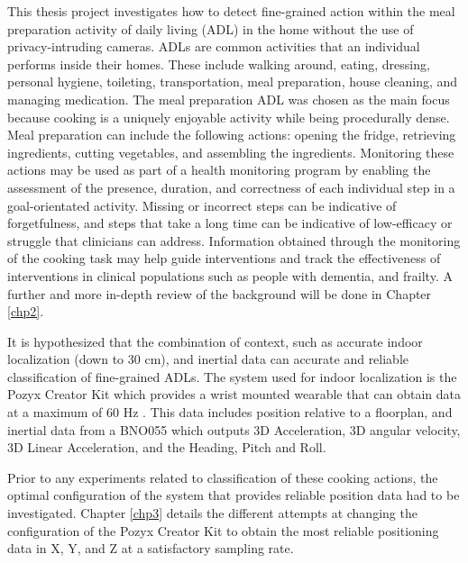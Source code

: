 This thesis project investigates how to detect fine-grained action within the meal preparation activity of daily living 
(ADL) in the home without the use of privacy-intruding cameras. ADLs are common activities that an individual 
performs inside their homes. These include walking around, eating, dressing, personal hygiene, toileting, 
transportation, meal preparation, house cleaning, and managing medication. The meal preparation ADL was chosen as the 
main focus because cooking is a uniquely enjoyable activity while being procedurally dense. 
Meal preparation can include 
the following actions: opening the fridge, retrieving ingredients, cutting vegetables, and assembling the ingredients. 
Monitoring these actions may be used as part of a health monitoring program by enabling the assessment of the presence, 
duration, and correctness of each individual step in a goal-orientated activity. Missing or incorrect steps can be indicative of 
forgetfulness, and steps that take a long time can be indicative of low-efficacy or struggle that clinicians can address.
Information obtained through the monitoring of the cooking task may help guide interventions 
and track the effectiveness of interventions in clinical populations such as people with dementia, and frailty. 
A further and more in-depth review of the background will be done in Chapter \ref{chp2}.

It is hypothesized that the combination of context, such as accurate 
indoor localization (down to 30 cm), and inertial data can accurate and reliable 
classification of fine-grained ADLs. 
The system used for indoor localization is the Pozyx Creator Kit which provides a wrist mounted 
wearable that can obtain data at a maximum of 60 Hz \cite{pozyx_creator_nodate}. This data includes position relative to a 
floorplan, and inertial data from a BNO055 which outputs 3D Acceleration, 3D angular velocity, 
3D Linear Acceleration, and the Heading, Pitch and Roll.

Prior to any experiments related to classification of these cooking actions, the optimal 
configuration of the system that provides reliable position data had to be investigated. 
Chapter \ref{chp3} details the different attempts at changing the configuration of the Pozyx 
Creator Kit to obtain the most reliable positioning data in X, Y, and Z at a satisfactory 
sampling rate. 
